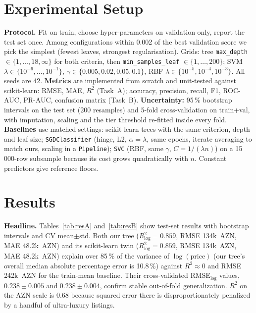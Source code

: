 \documentclass[10pt,twocolumn,a4paper]{article}
\begin{document}
\section{Experimental Setup}
\textbf{Protocol.} Fit on train, choose hyper-parameters on validation only, report the test set once. Among configurations within 0.002 of the best
validation score we pick the simplest (fewest leaves, strongest regularisation). Grids: tree \texttt{max\_depth} $\in\{1,\dots,18,\infty\}$ for both criteria,
then \texttt{min\_samples\_leaf} $\in\{1,\dots,200\}$; SVM $\lambda\in\{10^{-6},\dots,10^{-1}\}$, $\gamma\in\{0.005,0.02,0.05,0.1\}$, RBF $\lambda\in\{10^{-5},10^{-4},10^{-3}\}$.
All seeds are 42.
\textbf{Metrics} are implemented from scratch and unit-tested against scikit-learn: RMSE, MAE, $R^2$ (Task~A); accuracy, precision, recall, F1, ROC-AUC, PR-AUC, confusion matrix (Task~B).
\textbf{Uncertainty:} 95\,\% bootstrap intervals on the test set (200 resamples) and 5-fold cross-validation on train+val, with imputation, scaling and the tier threshold re-fitted inside every fold.
\textbf{Baselines} use matched settings: scikit-learn trees with the same criterion, depth and leaf size; \texttt{SGDClassifier} (hinge, L2, $\alpha=\lambda$, same epochs, iterate averaging to match ours, scaling in a \texttt{Pipeline});
\texttt{SVC} (RBF, same $\gamma$, $C=1/(\lambda n)$) on a 15\,000-row subsample because its cost grows quadratically with $n$. Constant predictors give reference floors.

\section{Results}
\textbf{Headline.} Tables~\ref{tab:resA} and~\ref{tab:resB} show test-set results with bootstrap intervals and CV mean$\pm$std.
Both our tree ($R^2_{\log}=0.859$, RMSE 134k~AZN, MAE 48.2k~AZN) and its scikit-learn twin ($R^2_{\log}=0.859$, RMSE 134k~AZN, MAE 48.2k~AZN) explain over 85\,\% of the variance of $\log(\text{price})$ (our tree's overall median absolute percentage error is 10.8\,\%) against $R^2\approx0$ and RMSE 242k~AZN for the train-mean baseline.
Their cross-validated RMSE$_{\log}$ values, $0.238\pm0.005$ and $0.238\pm0.004$, confirm stable out-of-fold generalization.
$R^2$ on the AZN scale is 0.68 because squared error there is disproportionately penalized by a handful of ultra-luxury listings.

\begin{table}[t]
  \centering
  \caption{Task A (price regression), test set; last column is 5-fold CV.}
  \label{tab:resA}
  \small
  \resizebox{\columnwidth}{!}{}
\end{table}
\end{document}
